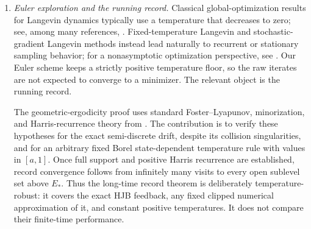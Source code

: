 \documentclass[11pt]{article}
\def\Xc{{\mathcal X}}
\def\hX{\widehat{\Xc}^{\,N}}
\theoremstyle{definition}
\theoremstyle{remark}
\numberwithin{equation}{section}
\begin{document}
\begin{enumerate}[label=\textup{(\roman*)},leftmargin=2.8em]
What is specific here is the singular semi-discrete potential.  The state space is the punctured open
set $\hX$, the drift $-\nabla E$ is only locally Lipschitz there and has linear rather than bounded
growth, and no boundary value is imposed on the collision diagonals.  The global dissipativity from
the first part replaces a global bounded-gradient hypothesis, while polarity in dimension $d\ge2$
replaces boundary conditions on the internal singular set.  We prove global strong well-posedness and
collision avoidance for every relaxed control, establish the dynamic programming principle on the
raw canonical space, identify the value function as an interior viscosity solution, obtain its local
$C^{2,\beta}$ regularity, and then use the HJB identity itself to bootstrap
$\Delta v_\lambda$ to $C^1_{\mathrm{loc}}$.  This yields a locally Lipschitz optimal feedback and a
strong verification theorem.  Recent numerical work on exploratory HJB temperature control is
discussed in \cite{WangLiWangZhang2026}; the present paper does not analyze a particular HJB
solver.

\item \emph{Euler exploration and the running record.}
Classical global-optimization results for Langevin dynamics typically use a temperature that decreases
to zero; see, among many references,
\cite{ChiangHwangSheu1987,HolleyKusuokaStroock1989,GelfandMitter1991}.  Fixed-temperature Langevin and stochastic-gradient
Langevin methods instead lead naturally to recurrent or stationary sampling behavior; for a
nonasymptotic optimization perspective, see \cite{RaginskyRakhlinTelgarsky2017}.  Our Euler scheme
keeps a strictly positive temperature floor, so the raw iterates are not expected to converge to a
minimizer.  The relevant object is the running record.

The geometric-ergodicity proof uses standard Foster--Lyapunov, minorization, and Harris-recurrence
theory from \cite{MeynTweedie2009}.  The contribution is to verify these hypotheses for the exact
semi-discrete drift, despite its collision singularities, and for an arbitrary fixed Borel
state-dependent temperature rule with values in $[a,1]$.  Once full support and positive Harris
recurrence are established, record convergence follows from infinitely many visits to every open
sublevel set above $E_*$.  Thus the long-time record theorem is deliberately temperature-robust: it
covers the exact HJB feedback, any fixed clipped numerical approximation of it, and constant positive
temperatures.  It does not compare their finite-time performance.

\end{enumerate}
\end{document}
